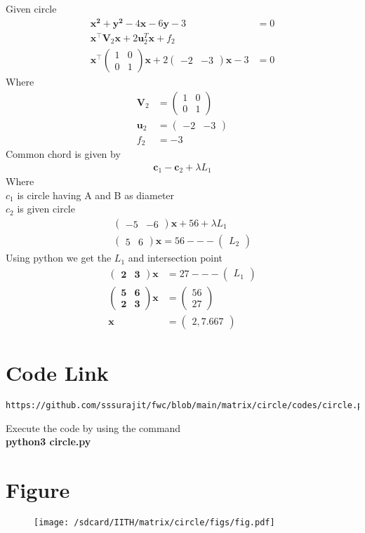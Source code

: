 \documentclass[journal,12pt,twocolumn]{IEEEtran}
\newcommand{\myvec}[1]{\ensuremath{\begin{pmatrix}#1\end{pmatrix}}}
\let\vec\mathbf
\begin{document}
Given circle
\begin{align}
    \vec{{x}^2+{y}^2}-4{\vec x}-6{\vec y}-3&=0\\
    \vec{x}^{\top}\vec{V}_2\vec{x}+2\vec{u}_2^T\vec{x}+f_2&\\
    \vec{x}^{\top}\myvec{1&0\\0&1}\vec{x}+2\myvec{-2&-3}\vec{x}-3&=0
\end{align}
Where
\begin{align}
    \vec{V}_2&=\myvec{1&0\\0&1}\\
    \vec{u}_2&=\myvec{-2&-3}\\
    f_2&={-3}
\end{align}
Common chord is given by
\begin{align}
    \vec{c}_1-\vec{c}_2+\lambda{L_1}
\end{align}
Where\\ $c_1$ is circle having A and B as diameter\\
        $c_2$ is given circle
\begin{align}
\myvec{-5&-6}\vec{x}+56+\lambda L_1\\
\myvec{5&6}\vec{x}=56---\myvec{L_2}
\end{align}
Using python we get the $L_1$ and intersection point
\begin{align}
    \vec{\myvec{2&3}}{\vec x}&=27 ---\myvec{L_1}\\
    \vec{\myvec{5&6\\2&3}}{\vec x}&={\myvec{56\\27}}\\
    \vec{x}&={\myvec{2,7.667}}
\end{align}
\section{\textbf{Code Link}}
\begin{lstlisting}
https://github.com/sssurajit/fwc/blob/main/matrix/circle/codes/circle.py
\end{lstlisting}
Execute the code by using the command
\\ \textbf{python3 circle.py}
\section{\textbf{Figure}}
\begin{figure}
    \centering
    \texttt{[image: /sdcard/IITH/matrix/circle/figs/fig.pdf]}
    \caption{}
    \label{fig}
\end{figure}
\end{document}
